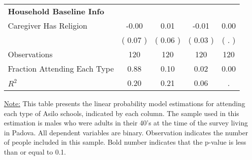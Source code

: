 \begin{table}[H]
{\begin{tabular}{lcccc}
\midrule
\textbf{Household Baseline Info} \\
\quad Caregiver Has Religion &     -0.00 &      0.01 &     -0.01 &      0.00 \\
\quad  & (     0.07 ) & (     0.06 )  & (     0.03 )  & (        . )  \\
\midrule
Observations & 120 & 120 & 120 & 120 \\
Fraction Attending Each Type &      0.88 &      0.10 &      0.02 &      0.00 \\
\midrule
$ R^2$ &      0.20 &      0.21 &      0.06 &         . \\
\bottomrule
\end{tabular}}
\end{table}
\begin{footnotesize}
\noindent\underline{Note:} This table presents the linear probability model estimations for attending each type of Asilo schools, indicated by each column. The sample used in this estimation is males who were adults in their 40's at the time of the survey living in Padova. All dependent variables are binary. Observation indicates the number of people included in this sample. Bold number indicates that the p-value is less than or equal to 0.1.
\end{footnotesize}
